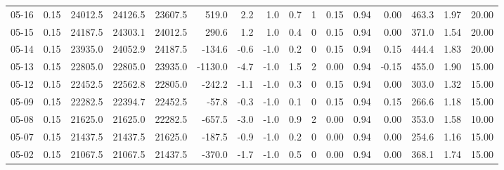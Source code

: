 \begin{threeparttable}
{\begin{tabular}{lrrrrrrrrrrrrrrr}
  05-16 &     0.15 & 24012.5 & 24126.5 & 23607.5 &      519.0 &            2.2 &                      1.0 &                 0.7 &              1 &       0.15 &      0.94 &           0.00 &            463.3 &            1.97 &                  20.00 \\
  05-15 &     0.15 & 24187.5 & 24303.1 & 24012.5 &      290.6 &            1.2 &                      1.0 &                 0.4 &              0 &       0.15 &      0.94 &           0.00 &            371.0 &            1.54 &                  20.00 \\
  05-14 &     0.15 & 23935.0 & 24052.9 & 24187.5 &     -134.6 &           -0.6 &                     -1.0 &                 0.2 &              0 &       0.15 &      0.94 &           0.15 &            444.4 &            1.83 &                  20.00 \\
  05-13 &     0.15 & 22805.0 & 22805.0 & 23935.0 &    -1130.0 &           -4.7 &                     -1.0 &                 1.5 &              2 &       0.00 &      0.94 &          -0.15 &            455.0 &            1.90 &                  15.00 \\
  05-12 &     0.15 & 22452.5 & 22562.8 & 22805.0 &     -242.2 &           -1.1 &                     -1.0 &                 0.3 &              0 &       0.15 &      0.94 &           0.00 &            303.0 &            1.32 &                  15.00 \\
  05-09 &     0.15 & 22282.5 & 22394.7 & 22452.5 &      -57.8 &           -0.3 &                     -1.0 &                 0.1 &              0 &       0.15 &      0.94 &           0.15 &            266.6 &            1.18 &                  15.00 \\
  05-08 &     0.15 & 21625.0 & 21625.0 & 22282.5 &     -657.5 &           -3.0 &                     -1.0 &                 0.9 &              2 &       0.00 &      0.94 &           0.00 &            353.0 &            1.58 &                  10.00 \\
  05-07 &     0.15 & 21437.5 & 21437.5 & 21625.0 &     -187.5 &           -0.9 &                     -1.0 &                 0.2 &              0 &       0.00 &      0.94 &           0.00 &            254.6 &            1.16 &                  15.00 \\
  05-02 &     0.15 & 21067.5 & 21067.5 & 21437.5 &     -370.0 &           -1.7 &                     -1.0 &                 0.5 &              0 &       0.00 &      0.94 &           0.00 &            368.1 &            1.74 &                  15.00 \\

\end{tabular}}
\end{threeparttable}
